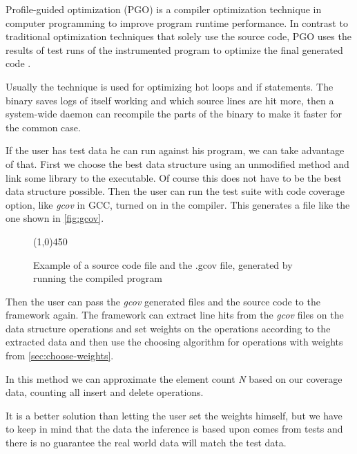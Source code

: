 \documentclass[a4paper,11pt]{article}
\begin{document}
			Profile-guided optimization (PGO) is a compiler optimization technique in computer programming
			to improve program runtime performance.  In contrast to traditional optimization techniques that
			solely use the source code, PGO uses the results of test runs of the instrumented program to
            optimize the final generated code \cite{Wipgo}.

            Usually the technique is used for optimizing hot loops and if statements. The binary saves logs of itself
            working and which source lines are hit more, then a system-wide daemon can recompile the parts of the binary to make it faster for the common case.

			If the user has test data he can run against his program, we can take advantage of that.  First
			we choose the best data structure using an unmodified method and link some library to the
			executable. Of course this does not have to be the best data structure possible. Then the user can run the test suite with code coverage option, like \emph{gcov} in GCC, turned on in the compiler. This
			generates a file like the one shown in \autoref{fig:gcov}.

			\begin{figure} \label{fig:gcov}
				

				\centering \line(1,0){450}

				

				\caption{Example of a source code file and the .gcov file, generated by running the
				compiled program}

				\label{fig:gcov}
			\end{figure}


			Then the user can pass the \emph{gcov} generated files and the source code to the framework
			again. The framework can extract line hits from the \emph{gcov} files on the data structure
			operations and set weights on the operations according to the extracted data and then use the
			choosing algorithm for operations with weights from \autoref{sec:choose-weights}.

            In this method we can approximate the element count \emph{N} based on our coverage data, counting all insert and delete operations.

			It is a better solution than letting the user set the weights himself, but we have to keep in mind 
			that the data the inference is based upon comes from tests and there is no guarantee the real world 
			data will match the test data.
\end{document}
